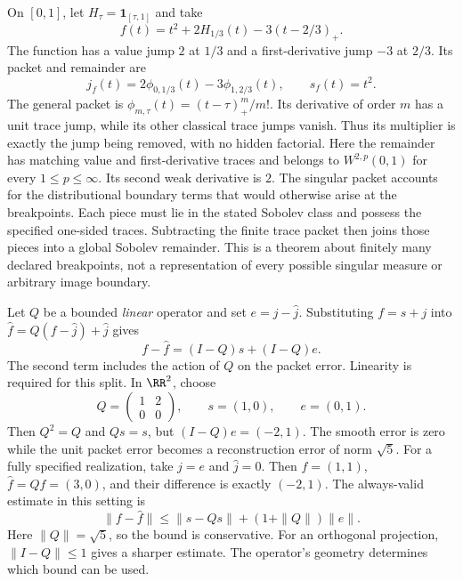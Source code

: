 On $[0,1]$, let $H_\tau=\mathbf1_{[\tau,1]}$ and take
\[
f(t)=t^2+2H_{1/3}(t)-3(t-2/3)_+.
\]
The function has a value jump $2$ at $1/3$ and a first-derivative jump $-3$ at $2/3$. Its packet and remainder are
\[
j_f(t)=2\phi_{0,1/3}(t)-3\phi_{1,2/3}(t),\qquad s_f(t)=t^2.
\]
The general packet is $\phi_{m,\tau}(t)=(t-\tau)_+^m/m!$. Its derivative of order $m$ has a unit trace jump, while its other classical trace jumps vanish. Thus its multiplier is exactly the jump being removed, with no hidden factorial.
Here the remainder has matching value and first-derivative traces and belongs to $W^{2,p}(0,1)$ for every $1\le p\le\infty$. Its second weak derivative is $2$. The singular packet accounts for the distributional boundary terms that would otherwise arise at the breakpoints.
Each piece must lie in the stated Sobolev class and possess the specified one-sided traces. Subtracting the finite trace packet then joins those pieces into a global Sobolev remainder. This is a theorem about finitely many declared breakpoints, not a representation of every possible singular measure or arbitrary image boundary.

Let $Q$ be a bounded \emph{linear} operator and set $e=j-\widehat j$. Substituting $f=s+j$ into $\widehat f=Q(f-\widehat j)+\widehat j$ gives
\[
f-\widehat f=(I-Q)s+(I-Q)e.
\]
The second term includes the action of $Q$ on the packet error. Linearity is required for this split.
In $\RR^2$, choose
\[
Q=\begin{pmatrix}1&2\\0&0\end{pmatrix},\qquad
s=(1,0),\qquad e=(0,1).
\]
Then $Q^2=Q$ and $Qs=s$, but $(I-Q)e=(-2,1)$. The smooth error is zero while the unit packet error becomes a reconstruction error of norm $\sqrt5$.
For a fully specified realization, take $j=e$ and $\widehat j=0$. Then $f=(1,1)$, $\widehat f=Qf=(3,0)$, and their difference is exactly $(-2,1)$.
The always-valid estimate in this setting is
\[
\|f-\widehat f\|\leq\|s-Qs\|+(1+\|Q\|)\|e\|.
\]
Here $\|Q\|=\sqrt5$, so the bound is conservative. For an orthogonal projection, $\|I-Q\|\le1$ gives a sharper estimate. The operator's geometry determines which bound can be used.


